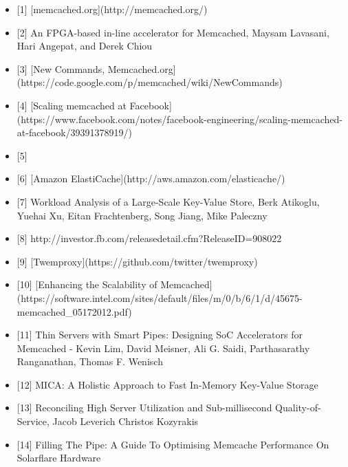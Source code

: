 \begin{itemize}
\tightlist
\item
  {[}1{]} {[}memcached.org{]}(http://memcached.org/)
\item
  {[}2{]} An FPGA-based in-line accelerator for Memcached, Maysam
  Lavasani, Hari Angepat, and Derek Chiou
\item
  {[}3{]} {[}New Commands,
  Memcached.org{]}(https://code.google.com/p/memcached/wiki/NewCommands)
\item
  {[}4{]} {[}Scaling memcached at
  Facebook{]}(https://www.facebook.com/notes/facebook-engineering/scaling-memcached-at-facebook/39391378919/)
\item
  {[}5{]}
\item
  {[}6{]} {[}Amazon ElastiCache{]}(http://aws.amazon.com/elasticache/)
\item
  {[}7{]} Workload Analysis of a Large-Scale Key-Value Store, Berk
  Atikoglu, Yuehai Xu, Eitan Frachtenberg, Song Jiang, Mike Paleczny
\item
  {[}8{]} http://investor.fb.com/releasedetail.cfm?ReleaseID=908022
\item
  {[}9{]} {[}Twemproxy{]}(https://github.com/twitter/twemproxy)
\item
  {[}10{]} {[}Enhancing the Scalability of
  Memcached{]}(https://software.intel.com/sites/default/files/m/0/b/6/1/d/45675-memcached\_05172012.pdf)
\item
  {[}11{]} Thin Servers with Smart Pipes: Designing SoC Accelerators for
  Memcached - Kevin Lim, David Meisner, Ali G. Saidi, Parthasarathy
  Ranganathan, Thomas F. Wenisch
\item
  {[}12{]} MICA: A Holistic Approach to Fast In-Memory Key-Value Storage
\item
  {[}13{]} Reconciling High Server Utilization and Sub-millisecond
  Quality-of-Service, Jacob Leverich Christos Kozyrakis
\item
  {[}14{]} Filling The Pipe: A Guide To Optimising Memcache Performance
  On Solarflare Hardware
\end{itemize}
